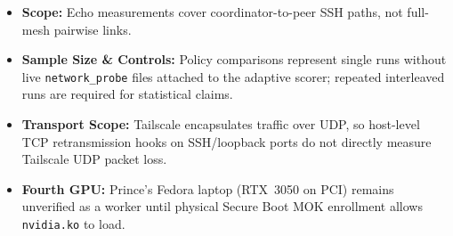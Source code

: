 \documentclass[11pt,a4paper]{article}
\begin{document}
\begin{itemize}
\sloppy
  \item \textbf{Scope:} Echo measurements cover coordinator-to-peer SSH paths, not full-mesh pairwise links.
  \item \textbf{Sample Size \& Controls:} Policy comparisons represent single runs without live \texttt{network\_probe} files attached to the adaptive scorer; repeated interleaved runs are required for statistical claims.
  \item \textbf{Transport Scope:} Tailscale encapsulates traffic over UDP, so host-level TCP retransmission hooks on SSH/loopback ports do not directly measure Tailscale UDP packet loss.
  \item \textbf{Fourth GPU:} Prince's Fedora laptop (RTX~3050 on PCI) remains unverified as a worker until physical Secure Boot MOK enrollment allows \texttt{nvidia.ko} to load.
\end{itemize}
\end{document}
